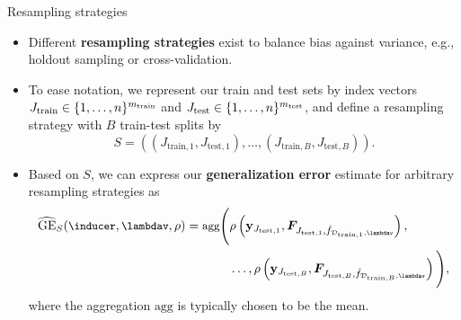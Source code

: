 \documentclass[11pt,compress,t,notes=noshow, xcolor=table]{beamer}
\begin{document}

\begin{vbframe}{Resampling strategies}

\begin{itemize}
  \item Different \textbf{resampling strategies} exist to balance bias against 
  variance, e.g., holdout sampling or cross-validation.
  \item To ease notation, we represent our train and test sets by index
  vectors $J_\mathrm{train} \in \{1, \ldots, n\}^{m_\mathrm{train}}$ and $J_\mathrm{test}
  \in \{1, \ldots, n\}^{m_\mathrm{test}}$, and define a resampling strategy with 
  $B$ train-test splits by $$S = \left((J_{\mathrm{train}, 1}, 
  J_{\mathrm{test}, 1}), \dots, (J_{\mathrm{train} ,B}, J_{\mathrm{test}, B}) 
  \right).$$
  \item Based on $S$, we can express our \textbf{generalization error} 
  estimate for arbitrary resampling strategies as
  \begin{equation*}
    \begin{split}
      \small
      \widehat{\mathrm{GE}}_S(\inducer, \lambdav, \rho) =
      \textrm{agg} \Bigg(& \rho \left( \yv_{J_{\mathrm{test}, 1}},
      \bm{F}_{J_{\mathrm{test}, 1}, \fh_{\mathcal{D}_{\mathrm{train}, 1}, 
      \lambdav}} \right), \\
      &\dots, \rho \left(\yv_{J_{\mathrm{test}, B}},
      \bm{F}_{J_{\mathrm{test}, B}, \fh_{\mathcal{D}_{\mathrm{train}, B}, 
      \lambdav}}
      \right) \Bigg),
    \end{split}
  \end{equation*}
  where the aggregation $\textrm{agg}$ is typically chosen to be the mean.
\end{itemize}

\end{vbframe}

\end{document}
